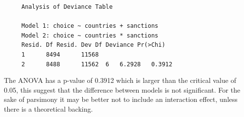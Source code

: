 \documentclass[12pt,letterpaper]{article}
\begin{document}
	
	
	 \begin{verbatim}
	 Analysis of Deviance Table
	 
	 Model 1: choice ~ countries + sanctions
	 Model 2: choice ~ countries * sanctions
	 Resid. Df Resid. Dev Df Deviance Pr(>Chi)
	 1      8494      11568                     
	 2      8488      11562  6   6.2928   0.3912
	 \end{verbatim}

\noindent The ANOVA has a p-value of 0.3912 which is larger than the critical value of 0.05, this suggest that the difference between models is not significant. For the sake of parsimony it may be better not to include an interaction effect, unless there is a theoretical backing.
\end{document}
